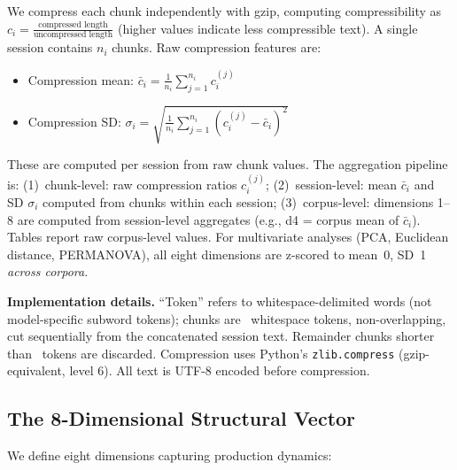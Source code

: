 \documentclass[final]{clv2025}
\begin{document}
We compress each chunk independently with gzip, computing compressibility as $c_i = \frac{\text{compressed length}}{\text{uncompressed length}}$ (higher values indicate less compressible text). A single session contains $n_i$ chunks. Raw compression features are:

\begin{itemize}
\item Compression mean: $\bar{c}_i = \frac{1}{n_i} \sum_{j=1}^{n_i} c_i^{(j)}$
\item Compression SD: $\sigma_i = \sqrt{\frac{1}{n_i} \sum_{j=1}^{n_i} (c_i^{(j)} - \bar{c}_i)^2}$
\end{itemize}

These are computed per session from raw chunk values. The aggregation pipeline is: (1)~chunk-level: raw compression ratios $c_i^{(j)}$; (2)~session-level: mean $\bar{c}_i$ and SD $\sigma_i$ computed from chunks within each session; (3)~corpus-level: dimensions 1--8 are computed from session-level aggregates (e.g., d4 = corpus mean of $\bar{c}_i$). Tables report raw corpus-level values. For multivariate analyses (PCA, Euclidean distance, PERMANOVA), all eight dimensions are z-scored to mean~0, SD~1 \textit{across corpora}.

\textbf{Implementation details.} ``Token'' refers to whitespace-delimited words (not model-specific subword tokens); chunks are \chunkTokens\ whitespace tokens, non-overlapping, cut sequentially from the concatenated session text. Remainder chunks shorter than \chunkTokens\ tokens are discarded. Compression uses Python's \texttt{zlib.compress} (gzip-equivalent, level 6). All text is UTF-8 encoded before compression.

\subsection{The 8-Dimensional Structural Vector}
\label{sec:recovery-def}

We define eight dimensions capturing production dynamics:
\end{document}
